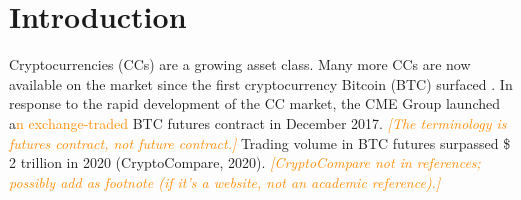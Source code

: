 \documentclass[11pt,a4paper,english]{article}
\providecommand{\natp}[1]{\textcolor{darkorange}{#1}}
\begin{document}
\begin{abstract}
{  \\
 Portfolio Selection, Spectral Risk Measurement,  Coherent Risk}\pagestyle{empty}\\
\end{abstract}





\clearpage
\section{Introduction}\label{sec:introduction}
Cryptocurrencies (CCs) are a growing asset class.
Many more CCs are now available on the market since the first
cryptocurrency Bitcoin (BTC) surfaced \citep{nakamoto2009}.
In response to the rapid development of the CC market, the CME Group
launched a\natp{n exchange-traded} BTC futures contract in December
2017. \natp{\em [The 
  terminology is futures contract, not future contract.]}
Trading volume in BTC futures surpassed \$ 2 trillion in 2020
(CryptoCompare, 2020). \natp{\em[CryptoCompare not in references;
  possibly add as footnote (if it's a website, not an academic
  reference).]} \medskip
\end{document}
